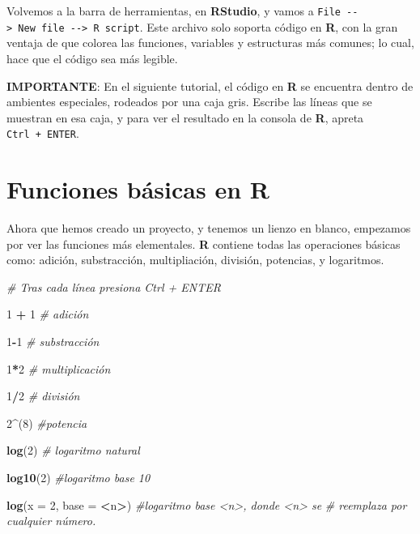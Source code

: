 \documentclass[12pt,letterpaper,]{book}
\newenvironment{Shaded}{\begin{snugshade}}{\end{snugshade}}
\newcommand{\KeywordTok}[1]{\textcolor[rgb]{0.13,0.29,0.53}{\textbf{#1}}}
\newcommand{\DataTypeTok}[1]{\textcolor[rgb]{0.13,0.29,0.53}{#1}}
\newcommand{\DecValTok}[1]{\textcolor[rgb]{0.00,0.00,0.81}{#1}}
\newcommand{\StringTok}[1]{\textcolor[rgb]{0.31,0.60,0.02}{#1}}
\newcommand{\CommentTok}[1]{\textcolor[rgb]{0.56,0.35,0.01}{\textit{#1}}}
\newcommand{\OperatorTok}[1]{\textcolor[rgb]{0.81,0.36,0.00}{\textbf{#1}}}
\newcommand{\NormalTok}[1]{#1}
\begin{document}
Volvemos a la barra de herramientas, en \textbf{RStudio}, y vamos a
\texttt{File\ -\/-\textgreater{}\ New\ file\ -\/-\textgreater{}\ R\ script}.
Este archivo solo soporta código en \textbf{R}, con la gran ventaja de
que colorea las funciones, variables y estructuras más comunes; lo cual,
hace que el código sea más legible.

\textbf{IMPORTANTE}: En el siguiente tutorial, el código en \textbf{R}
se encuentra dentro de ambientes especiales, rodeados por una caja gris.
Escribe las líneas que se muestran en esa caja, y para ver el resultado
en la consola de \textbf{R}, apreta \texttt{Ctrl\ +\ ENTER}.

\section{Funciones básicas en R}\label{funciones-basicas-en-r}

Ahora que hemos creado un proyecto, y tenemos un lienzo en blanco,
empezamos por ver las funciones más elementales. \textbf{R} contiene
todas las operaciones básicas como: adición, substracción,
multipliación, división, potencias, y logaritmos.

\begin{Shaded}
\begin{Highlighting}[]
\CommentTok{# Tras cada línea presiona Ctrl + ENTER}

\DecValTok{1} \OperatorTok{+}\StringTok{ }\DecValTok{1} \CommentTok{# adición}

\DecValTok{1}\OperatorTok{-}\DecValTok{1} \CommentTok{# substracción}

\DecValTok{1}\OperatorTok{*}\DecValTok{2} \CommentTok{# multiplicación}

\DecValTok{1}\OperatorTok{/}\DecValTok{2} \CommentTok{# división}

\DecValTok{2}\OperatorTok{^}\NormalTok{(}\DecValTok{8}\NormalTok{) }\CommentTok{#potencia}

\KeywordTok{log}\NormalTok{(}\DecValTok{2}\NormalTok{) }\CommentTok{# logaritmo natural}

\KeywordTok{log10}\NormalTok{(}\DecValTok{2}\NormalTok{) }\CommentTok{#logaritmo base 10}

\KeywordTok{log}\NormalTok{(}\DataTypeTok{x =} \DecValTok{2}\NormalTok{, }\DataTypeTok{base =} \OperatorTok{<}\NormalTok{n}\OperatorTok{>}\NormalTok{) }\CommentTok{#logaritmo base <n>, donde <n> se}
                       \CommentTok{#   reemplaza por cualquier número.}
\end{Highlighting}
\end{Shaded}
\end{document}
